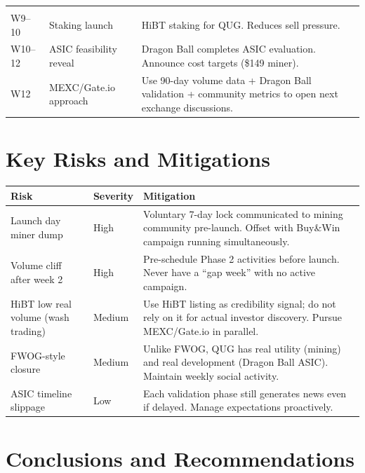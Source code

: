 \documentclass[11pt,a4paper]{article}
\begin{document}
\begin{center}
\begin{longtable}{C{2cm} L{4cm} L{7cm}}
   \\

  W9--10 & Staking launch & HiBT staking for QUG. Reduces sell pressure. \\
  W10--12 & ASIC feasibility reveal & Dragon Ball completes ASIC evaluation. Announce cost targets (\$149 miner). \\
  W12 & MEXC/Gate.io approach & Use 90-day volume data + Dragon Ball validation + community metrics to open next exchange discussions. \\
\end{longtable}
\end{center}

\section{Key Risks and Mitigations}

\begin{center}
\begin{tabular}{L{3.5cm} C{1.5cm} L{7cm}}
  \toprule
  \textbf{Risk} & \textbf{Severity} & \textbf{Mitigation} \\
  \midrule
  Launch day miner dump & High & Voluntary 7-day lock communicated to mining community pre-launch. Offset with Buy\&Win campaign running simultaneously. \\
  Volume cliff after week 2 & High & Pre-schedule Phase 2 activities before launch. Never have a ``gap week'' with no active campaign. \\
  HiBT low real volume (wash trading) & Medium & Use HiBT listing as credibility signal; do not rely on it for actual investor discovery. Pursue MEXC/Gate.io in parallel. \\
  FWOG-style closure & Medium & Unlike FWOG, QUG has real utility (mining) and real development (Dragon Ball ASIC). Maintain weekly social activity. \\
  ASIC timeline slippage & Low & Each validation phase still generates news even if delayed. Manage expectations proactively. \\
  \bottomrule
\end{tabular}
\end{center}

\section{Conclusions and Recommendations}
\end{document}
